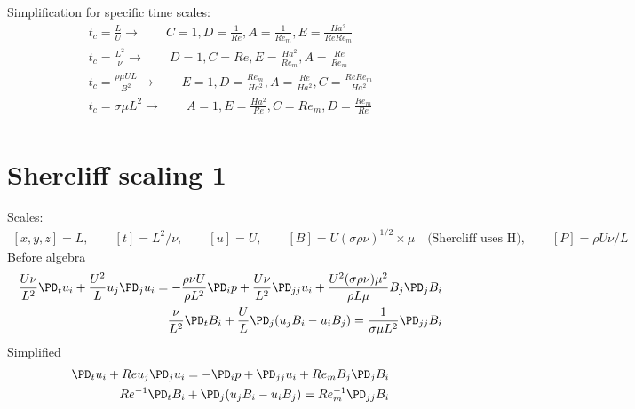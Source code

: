\documentclass[11pt]{article}
\begin{document}
Simplification for specific time scales:
\begin{equation}\begin{aligned}
	t_c = \frac{L}{U} \rightarrow \qquad C = 1, D = \frac{1}{Re}, A = \frac{1}{Re_m}, E = \frac{Ha^2}{Re Re_m} \\
	t_c = \frac{L^2}{\nu} \rightarrow \qquad D = 1, C = Re, E = \frac{Ha^2}{Re_m}, A = \frac{Re}{Re_m} \\
	t_c = \frac{\rho \mu U L}{B^2} \rightarrow \qquad E = 1, D = \frac{Re_m}{Ha^2}, A = \frac{Re}{Ha^2}, C = \frac{Re Re_m}{Ha^2} \\
	t_c = \sigma \mu L^2 \rightarrow \qquad A = 1,E = \frac{Ha^2}{Re}, C = Re_m, D = \frac{Re_m}{Re} \\
\end{aligned} \end{equation}

\section{Shercliff scaling 1}
Scales:
\begin{equation}\begin{aligned}
	[x,y,z] = L, \qquad
	[t] = L^2 / \nu, \qquad
	[u] = U, \qquad
	[B] = U (\sigma \rho \nu)^{1/2} \times \mu \quad \text{(Shercliff uses H)}, \qquad
	[P] = \rho U \nu / L
\end{aligned} \end{equation}
Before algebra
\begin{equation}\begin{aligned}
\frac{U \nu}{L^2} \PD_t u_i+ \frac{U^2}{L} u_j\PD_j u_i =-\frac{\rho \nu U}{\rho L^2}\PD_i p+ \frac{U \nu}{L^2} \PD_{jj} u_i + \frac{U^2 (\sigma \rho \nu) \mu^2}{\rho L \mu} B_j \PD_j B_i \\
\frac{\nu}{L^2} \PD_t B_i + \frac{U}{L} \PD_j (u_j B_i - u_i B_j) = \frac{1}{\sigma \mu L^2} \PD_{jj} B_i
\end{aligned} \end{equation}
Simplified
\begin{equation}\begin{aligned}
\PD_t u_i+ Re u_j\PD_j u_i =-\PD_i p+ \PD_{jj} u_i + Re_m B_j \PD_j B_i \\
Re^{-1} \PD_t B_i + \PD_j (u_j B_i - u_i B_j) = Re_m^{-1} \PD_{jj} B_i
\end{aligned} \end{equation}
\end{document}
